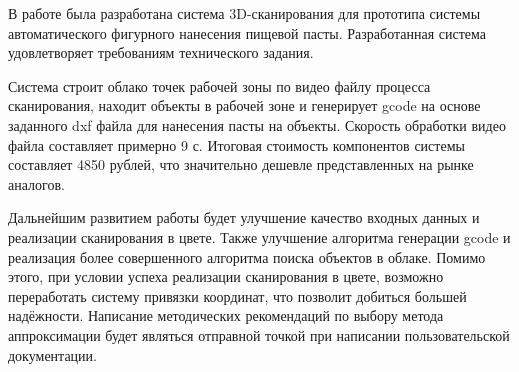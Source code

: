 \conclusion
В работе была разработана система 3D-сканирования для прототипа системы автоматического фигурного нанесения пищевой пасты. Разработанная система удовлетворяет требованиям технического задания.

Система строит облако точек рабочей зоны по видео файлу процесса сканирования, находит объекты в рабочей зоне и генерирует gcode на основе заданного dxf файла для нанесения пасты на объекты. Скорость обработки видео файла составляет примерно 9 с. Итоговая стоимость компонентов системы составляет 4850 рублей, что значительно дешевле представленных на рынке аналогов.

Дальнейшим развитием работы будет улучшение качество входных данных и реализации сканирования в цвете. Также улучшение алгоритма генерации gcode и реализация более совершенного алгоритма поиска объектов в облаке. Помимо этого, при условии успеха реализации сканирования в цвете, возможно переработать систему привязки координат, что позволит добиться большей надёжности. Написание методических рекомендаций по выбору метода аппроксимации будет являться отправной точкой при написании пользовательской документации.